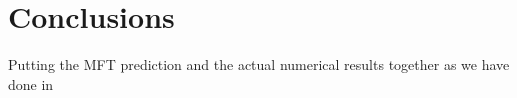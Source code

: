 \section{Conclusions} \label{sec:conc}
Putting the MFT prediction and the actual numerical results together as we have done in